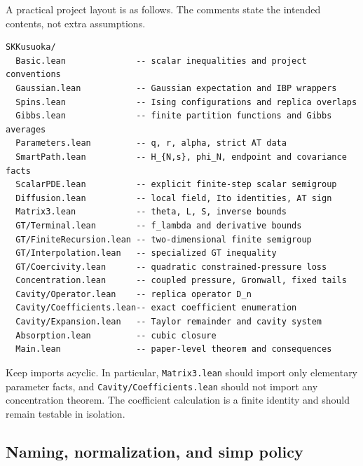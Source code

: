 \documentclass[11pt]{article}
\numberwithin{equation}{section}
\newcommand{\1}{\mathbf 1}
\begin{document}
A practical project layout is as follows.  The comments state the intended
contents, not extra assumptions.
\begin{lstlisting}
SKKusuoka/
  Basic.lean              -- scalar inequalities and project conventions
  Gaussian.lean           -- Gaussian expectation and IBP wrappers
  Spins.lean              -- Ising configurations and replica overlaps
  Gibbs.lean              -- finite partition functions and Gibbs averages
  Parameters.lean         -- q, r, alpha, strict AT data
  SmartPath.lean          -- H_{N,s}, phi_N, endpoint and covariance facts
  ScalarPDE.lean          -- explicit finite-step scalar semigroup
  Diffusion.lean          -- local field, Ito identities, AT sign
  Matrix3.lean            -- theta, L, S, inverse bounds
  GT/Terminal.lean        -- f_lambda and derivative bounds
  GT/FiniteRecursion.lean -- two-dimensional finite semigroup
  GT/Interpolation.lean   -- specialized GT inequality
  GT/Coercivity.lean      -- quadratic constrained-pressure loss
  Concentration.lean      -- coupled pressure, Gronwall, fixed tails
  Cavity/Operator.lean    -- replica operator D_n
  Cavity/Coefficients.lean-- exact coefficient enumeration
  Cavity/Expansion.lean   -- Taylor remainder and cavity system
  Absorption.lean         -- cubic closure
  Main.lean               -- paper-level theorem and consequences
\end{lstlisting}

Keep imports acyclic.  In particular, \texttt{Matrix3.lean} should import
only elementary parameter facts, and \texttt{Cavity/Coefficients.lean}
should not import any concentration theorem.  The coefficient calculation
is a finite identity and should remain testable in isolation.

\subsection{Naming, normalization, and simp policy}
\end{document}
